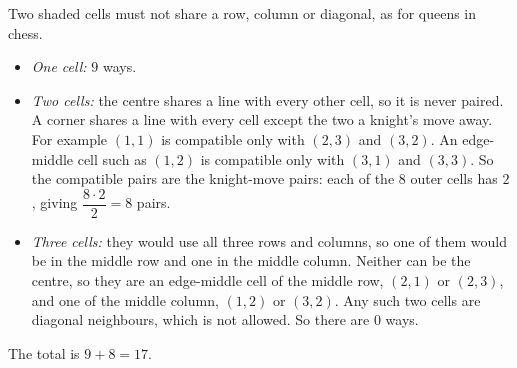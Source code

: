 Two shaded cells must not share a row, column or diagonal, as for queens in chess.
\begin{itemize}
\item \emph{One cell:} $9$ ways.
\item \emph{Two cells:} the centre shares a line with every other cell, so it is never paired. A corner shares a line with every cell except the two a knight's move away. For example $(1,1)$ is compatible only with $(2,3)$ and $(3,2)$. An edge-middle cell such as $(1,2)$ is compatible only with $(3,1)$ and $(3,3)$. So the compatible pairs are the knight-move pairs: each of the $8$ outer cells has $2$, giving $\dfrac{8\cdot2}{2}=8$ pairs.
\item \emph{Three cells:} they would use all three rows and columns, so one of them would be in the middle row and one in the middle column. Neither can be the centre, so they are an edge-middle cell of the middle row, $(2,1)$ or $(2,3)$, and one of the middle column, $(1,2)$ or $(3,2)$. Any such two cells are diagonal neighbours, which is not allowed. So there are $0$ ways.
\end{itemize}
The total is $9+8=\boxed{17}$.

